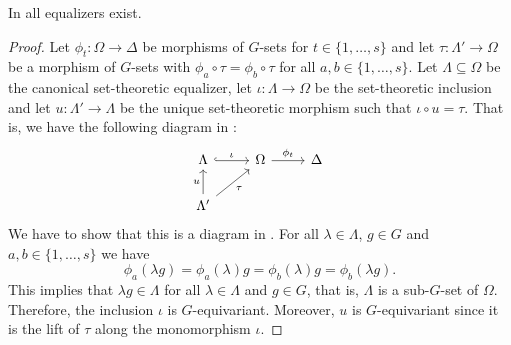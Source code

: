 \begin{prop}[Equalizers]\label{prop:equalizers_in_G_sets}
In \Gset{} all equalizers exist.
\end{prop}
\begin{proof}
Let $\phi_t\colon \Omega \to \Delta$ be morphisms of $G$-sets for $t \in \{1,\dots,s\}$ and let $\tau \colon \Lambda' \to \Omega$ be a morphism of $G$-sets with $\phi_a \circ \tau = \phi_b \circ \tau$ for all $a,b \in \{1,\dots,s\}$. Let $\Lambda \subseteq \Omega$ be the canonical set-theoretic equalizer, let $\iota\colon \Lambda \to \Omega$ be the set-theoretic inclusion and let $u\colon \Lambda' \to \Lambda$ be the unique set-theoretic morphism such that $\iota \circ u = \tau$. That is, we have the following diagram in \Set{}:
\[
\begin{tikzcd}
\Lambda \arrow[r, "\iota", hook]                  & \Omega \arrow[r, "\phi_t"] & \Delta \\
\Lambda' \arrow[ru, "\tau"'] \arrow[u, "u"]       &                            &       
\end{tikzcd}
\]
We have to show that this is a diagram in \Gset{}. For all $\lambda \in \Lambda$, $g \in G$ and $a,b \in \{1,\dots,s\}$ we have \[\phi_a(\lambda g) = \phi_a(\lambda)g = \phi_b(\lambda)g = \phi_b(\lambda g).\] This implies that $\lambda g \in \Lambda$ for all $\lambda \in \Lambda$ and $g \in G$, that is, $\Lambda$ is a sub-$G$-set of $\Omega$. Therefore, the inclusion $\iota$ is $G$-equivariant. Moreover, $u$ is $G$-equivariant since it is the lift of $\tau$ along the monomorphism $\iota$.
\end{proof}

